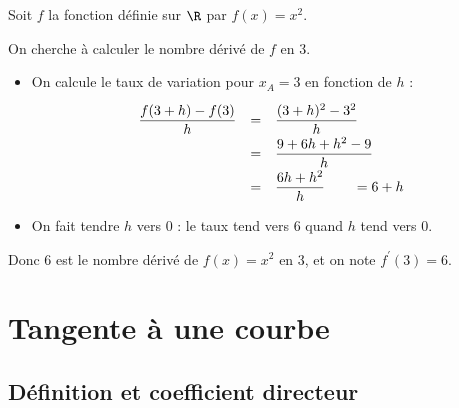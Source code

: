 \begin{ex}
	Soit $f$ la fonction définie sur $\R$ par $f(x) = x^2$.

	On cherche à calculer le nombre dérivé de $f$ en $3$.

	\begin{itemize}
		\item On calcule le taux de variation pour $x_A=3$ en fonction de $h$ :
		      \[
			      \def\arraystretch{2}
			      \begin{array}{rcl}
				      \dfrac{f(3+h)-f(3)}{h} & = & \dfrac{(3+h)^2 - 3^2}{h}        \\
				                             & = & \dfrac{9 + 6h + h^2 - 9}{h}     \\
				                             & = & \dfrac{6h + h^2}{h} \qquad= 6+h
			      \end{array}
		      \]
		\item On fait tendre $h$ vers $0$ : le taux tend vers $6$ quand $h$ tend vers $0$.
	\end{itemize}

	Donc $6$ est le nombre dérivé de $f(x)=x^2$ en $3$, et on note $f^\prime(3) = 6$.
\end{ex}

\section{Tangente à une courbe}

\subsection{Définition et coefficient directeur}

